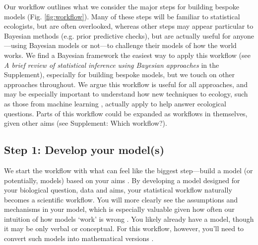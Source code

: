 \documentclass[11pt]{article}
\begin{document}
Our workflow outlines what we consider the major steps for building bespoke models (Fig. \ref{fig:workflow}). Many of these steps will be familiar to statistical ecologists, but are often overlooked, whereas other steps may appear particular to Bayesian methods (e.g. prior predictive checks), but are actually useful for anyone---using Bayesian models or not---to challenge their models of how the world works. We find a Bayesian framework the easiest way to apply this workflow (see \emph{A brief review of statistical inference using Bayesian approaches} in the Supplement), especially for building bespoke models, but we touch on other approaches throughout. We argue this workflow is useful for all approaches, and may be especially important to understand how new techniques to ecology, such as those from machine learning \citep{pichler2023machine}, actually apply to help answer ecological questions. Parts of this workflow could be expanded as workflows in themselves, given other aims (see Supplement: Which workflow?). %

\subsection*{Step 1: Develop your model(s)} 

We start the workflow with what can feel like the biggest step---build a model (or potentially, models) based on your aims \citep{hilborn2013ecological}. By developing a model designed for your biological question, data and aims, your statistical workflow naturally becomes a scientific workflow. You will more clearly see the assumptions and mechanisms in your model, which is especially valuable given how often our intuition of how models `work' is wrong \citep{kokko2005useful}. You likely already have a model, though it may be only verbal or conceptual. For this workflow, however, you’ll need to convert such models into mathematical versions \citep{servedio2014not}. %
\end{document}
